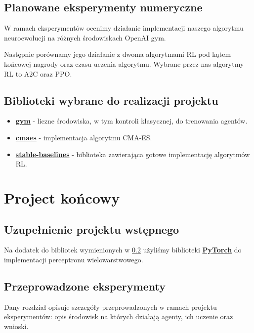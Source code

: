 \documentclass[12pt,a4paper]{article}
\begin{document}
\subsection{Planowane eksperymenty numeryczne}\label{subsection:planned}

W ramach eksperymentów ocenimy działanie implementacji naszego algorytmu
neuroewolucji na różnych środowiskach OpenAI gym.

Następnie porównamy jego działanie z dwoma algorytmami RL pod kątem
końcowej nagrody oraz czasu uczenia algorytmu. Wybrane przez nas
algorytmy RL to A2C oraz PPO.


\subsection{Biblioteki wybrane do realizacji projektu}\label{subsection:libs}

\begin{itemize}
  \item \textbf{\href{https://github.com/openai/gym}{gym}} - liczne środowiska, w tym kontroli klasycznej,
        do trenowania agentów.
  \item \textbf{\href{https://github.com/CyberAgentAILab/cmaes}{cmaes}} -
        implementacja algorytmu CMA-ES.
  \item \textbf{\href{https://github.com/DLR-RM/stable-baselines3}{stable-baselines}} -
        biblioteka zawierająca gotowe implementację algorytmów RL.
\end{itemize}

\pagebreak
\section{Project końcowy}

\subsection{Uzupełnienie projektu wstępnego}

Na dodatek do bibliotek wymienionych w \ref{subsection:libs} użyliśmy
biblioteki \textbf{\href{https://pytorch.org/}{PyTorch}} do implementacji
perceptronu wielowarstwowego.

\subsection{Przeprowadzone eksperymenty}

Dany rozdział opisuje szczegóły przeprowadzonych w ramach projektu
eksperymentów: opis środowisk na których działają agenty, ich uczenie oraz
wnioski.
\end{document}
